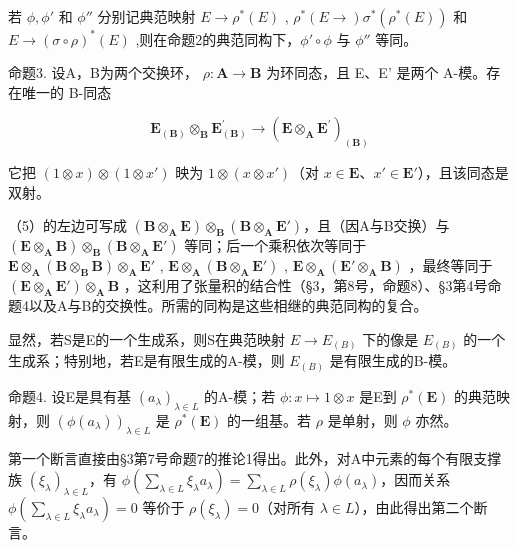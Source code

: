 若 \(\phi, \phi'\) 和 \(\phi''\) 分别记典范映射 \(E \to \rho^*(E)\) , \(\rho^*(E \to) \sigma^*(\rho^*(E))\) 和 \(E \to (\sigma \circ \rho)^*(E)\) ,则在命题2的典范同构下，\(\phi' \circ \phi\) 与 \(\phi''\) 等同。

命题3. 设A，B为两个交换环， \(\rho: \mathbf{A} \to \mathbf{B}\) 为环同态，且 E、E' 是两个 A-模。存在唯一的 B-同态

\[
\mathbf {E} _ {(\mathbf {B})} \otimes_ {\mathbf {B}} \mathbf {E} _ {(\mathbf {B})} ^ {\prime} \rightarrow (\mathbf {E} \otimes_ {\mathbf {A}} \mathbf {E} ^ {\prime}) _ {(\mathbf {B})}\tag{5}
\]

它把 \((1 \otimes x) \otimes (1 \otimes x')\) 映为 \(1 \otimes (x \otimes x')\)（对 \(x \in \mathbf{E}\)、\(x' \in \mathbf{E}'\)），且该同态是双射。

（5）的左边可写成 \((\mathbf{B} \otimes_{\mathbf{A}} \mathbf{E}) \otimes_{\mathbf{B}} (\mathbf{B} \otimes_{\mathbf{A}} \mathbf{E}')\)，且（因A与B交换）与 \((\mathbf{E} \otimes_{\mathbf{A}} \mathbf{B}) \otimes_{\mathbf{B}} (\mathbf{B} \otimes_{\mathbf{A}} \mathbf{E}')\) 等同；后一个乘积依次等同于 \(\mathbf{E} \otimes_{\mathbf{A}} (\mathbf{B} \otimes_{\mathbf{B}} \mathbf{B}) \otimes_{\mathbf{A}} \mathbf{E}'\) , \(\mathbf{E} \otimes_{\mathbf{A}} (\mathbf{B} \otimes_{\mathbf{A}} \mathbf{E}')\) , \(\mathbf{E} \otimes_{\mathbf{A}} (\mathbf{E}' \otimes_{\mathbf{A}} \mathbf{B})\) ，最终等同于 \((\mathbf{E} \otimes_{\mathbf{A}} \mathbf{E}') \otimes_{\mathbf{A}} \mathbf{B}\) ，这利用了张量积的结合性（§3，第8号，命题8）、§3第4号命题4以及A与B的交换性。所需的同构是这些相继的典范同构的复合。

显然，若S是E的一个生成系，则S在典范映射 \(E \rightarrow E_{(B)}\) 下的像是 \(E_{(B)}\) 的一个生成系；特别地，若E是有限生成的A-模，则 \(E_{(B)}\) 是有限生成的B-模。

命题4. 设E是具有基 \((a_{\lambda})_{\lambda \in L}\) 的A-模；若 \(\phi : x \mapsto 1 \otimes x\) 是E到 \(\rho^{*}(\mathbf{E})\) 的典范映射，则 \((\phi(a_{\lambda}))_{\lambda \in L}\) 是 \(\rho^{*}(\mathbf{E})\) 的一组基。若 \(\rho\) 是单射，则 \(\phi\) 亦然。

第一个断言直接由§3第7号命题7的推论1得出。此外，对A中元素的每个有限支撑族 \((\xi_{\lambda})_{\lambda \in L}\)，有 \(\phi\left(\sum_{\lambda \in L} \xi_{\lambda} a_{\lambda}\right) = \sum_{\lambda \in L} \rho(\xi_{\lambda}) \phi(a_{\lambda})\)，因而关系 \(\phi\left(\sum_{\lambda \in L} \xi_{\lambda} a_{\lambda}\right) = 0\) 等价于 \(\rho(\xi_{\lambda}) = 0\)（对所有 \(\lambda \in L\)），由此得出第二个断言。

